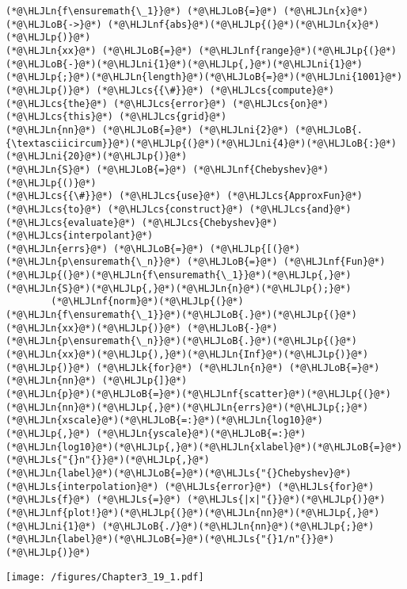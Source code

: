 \documentclass[12pt,a4paper]{article}
\newcommand{\HLJLk}[1]{\textcolor[RGB]{148,91,176}{\textbf{#1}}}
\newcommand{\HLJLn}[1]{#1}
\newcommand{\HLJLnf}[1]{\textcolor[RGB]{66,102,213}{#1}}
\newcommand{\HLJLs}[1]{\textcolor[RGB]{201,61,57}{#1}}
\newcommand{\HLJLni}[1]{\textcolor[RGB]{59,151,46}{#1}}
\newcommand{\HLJLoB}[1]{\textcolor[RGB]{102,102,102}{\textbf{#1}}}
\newcommand{\HLJLp}[1]{#1}
\newcommand{\HLJLcs}[1]{\textcolor[RGB]{153,153,119}{\textit{#1}}}
\begin{document}
\begin{lstlisting}
(*@\HLJLn{f\ensuremath{\_1}}@*) (*@\HLJLoB{=}@*) (*@\HLJLn{x}@*) (*@\HLJLoB{->}@*) (*@\HLJLnf{abs}@*)(*@\HLJLp{(}@*)(*@\HLJLn{x}@*)(*@\HLJLp{)}@*)
(*@\HLJLn{xx}@*) (*@\HLJLoB{=}@*) (*@\HLJLnf{range}@*)(*@\HLJLp{(}@*)(*@\HLJLoB{-}@*)(*@\HLJLni{1}@*)(*@\HLJLp{,}@*)(*@\HLJLni{1}@*)(*@\HLJLp{;}@*)(*@\HLJLn{length}@*)(*@\HLJLoB{=}@*)(*@\HLJLni{1001}@*)(*@\HLJLp{)}@*) (*@\HLJLcs{{\#}}@*) (*@\HLJLcs{compute}@*) (*@\HLJLcs{the}@*) (*@\HLJLcs{error}@*) (*@\HLJLcs{on}@*) (*@\HLJLcs{this}@*) (*@\HLJLcs{grid}@*)
(*@\HLJLn{nn}@*) (*@\HLJLoB{=}@*) (*@\HLJLni{2}@*) (*@\HLJLoB{.{\textasciicircum}}@*)(*@\HLJLp{(}@*)(*@\HLJLni{4}@*)(*@\HLJLoB{:}@*)(*@\HLJLni{20}@*)(*@\HLJLp{)}@*)
(*@\HLJLn{S}@*) (*@\HLJLoB{=}@*) (*@\HLJLnf{Chebyshev}@*)(*@\HLJLp{()}@*)
(*@\HLJLcs{{\#}}@*) (*@\HLJLcs{use}@*) (*@\HLJLcs{ApproxFun}@*) (*@\HLJLcs{to}@*) (*@\HLJLcs{construct}@*) (*@\HLJLcs{and}@*) (*@\HLJLcs{evaluate}@*) (*@\HLJLcs{Chebyshev}@*) (*@\HLJLcs{interpolant}@*)
(*@\HLJLn{errs}@*) (*@\HLJLoB{=}@*) (*@\HLJLp{[(}@*) (*@\HLJLn{p\ensuremath{\_n}}@*) (*@\HLJLoB{=}@*) (*@\HLJLnf{Fun}@*)(*@\HLJLp{(}@*)(*@\HLJLn{f\ensuremath{\_1}}@*)(*@\HLJLp{,}@*)(*@\HLJLn{S}@*)(*@\HLJLp{,}@*)(*@\HLJLn{n}@*)(*@\HLJLp{);}@*)
        (*@\HLJLnf{norm}@*)(*@\HLJLp{(}@*)(*@\HLJLn{f\ensuremath{\_1}}@*)(*@\HLJLoB{.}@*)(*@\HLJLp{(}@*)(*@\HLJLn{xx}@*)(*@\HLJLp{)}@*) (*@\HLJLoB{-}@*) (*@\HLJLn{p\ensuremath{\_n}}@*)(*@\HLJLoB{.}@*)(*@\HLJLp{(}@*)(*@\HLJLn{xx}@*)(*@\HLJLp{),}@*)(*@\HLJLn{Inf}@*)(*@\HLJLp{)}@*)  (*@\HLJLp{)}@*) (*@\HLJLk{for}@*) (*@\HLJLn{n}@*) (*@\HLJLoB{=}@*) (*@\HLJLn{nn}@*) (*@\HLJLp{]}@*)
(*@\HLJLn{p}@*)(*@\HLJLoB{=}@*)(*@\HLJLnf{scatter}@*)(*@\HLJLp{(}@*)(*@\HLJLn{nn}@*)(*@\HLJLp{,}@*)(*@\HLJLn{errs}@*)(*@\HLJLp{;}@*)(*@\HLJLn{xscale}@*)(*@\HLJLoB{=:}@*)(*@\HLJLn{log10}@*)(*@\HLJLp{,}@*) (*@\HLJLn{yscale}@*)(*@\HLJLoB{=:}@*)(*@\HLJLn{log10}@*)(*@\HLJLp{,}@*)(*@\HLJLn{xlabel}@*)(*@\HLJLoB{=}@*)(*@\HLJLs{"{}n"{}}@*)(*@\HLJLp{,}@*)
(*@\HLJLn{label}@*)(*@\HLJLoB{=}@*)(*@\HLJLs{"{}Chebyshev}@*) (*@\HLJLs{interpolation}@*) (*@\HLJLs{error}@*) (*@\HLJLs{for}@*) (*@\HLJLs{f}@*) (*@\HLJLs{=}@*) (*@\HLJLs{|x|"{}}@*)(*@\HLJLp{)}@*)
(*@\HLJLnf{plot!}@*)(*@\HLJLp{(}@*)(*@\HLJLn{nn}@*)(*@\HLJLp{,}@*)(*@\HLJLni{1}@*) (*@\HLJLoB{./}@*)(*@\HLJLn{nn}@*)(*@\HLJLp{;}@*)(*@\HLJLn{label}@*)(*@\HLJLoB{=}@*)(*@\HLJLs{"{}1/n"{}}@*)(*@\HLJLp{)}@*)
\end{lstlisting}

\texttt{[image: /figures/Chapter3\_19\_1.pdf]}
\end{document}

